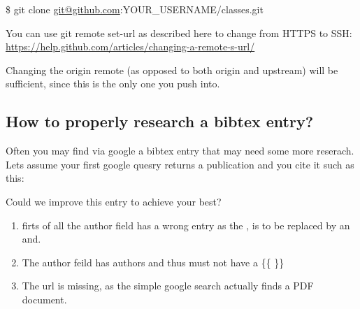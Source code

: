 \$ git clone \href{mailto:git@github.com}{git@github.com}:YOUR\_USERNAME/classes.git

You can use git remote set-url as described here to change from HTTPS
to SSH: \url{https://help.github.com/articles/changing-a-remote-s-url/}

Changing the origin remote (as opposed to both origin and upstream)
will be sufficient, since this is the only one you push into.


\subsection{How to properly research a bibtex entry?}
\label{\detokenize{faq:how-to-properly-research-a-bibtex-entry}}
Often you may find via google a bibtex entry that may need some more
reserach. Lets assume your first google quesry returns a publication
and you cite it such as this:

\begin{sphinxVerbatim}[commandchars=\\\{\}]
            
             
       
      
      
            
      
\end{sphinxVerbatim}

Could we improve this entry to achieve your best?
\begin{enumerate}
\item {} 
firts of all the author field has a wrong entry as the , is to be replaced by an and.

\item {} 
The author feild  has authors and thus must not have a \{\{ \}\}

\item {} 
The url is missing, as the simple google search actually finds a PDF document.

\end{enumerate}

